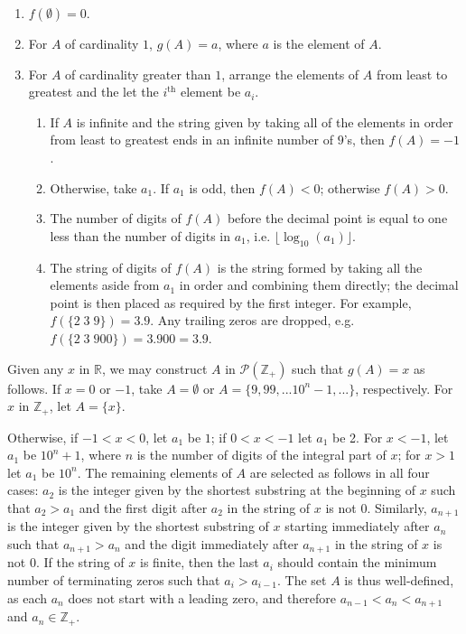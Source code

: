 \documentclass[12 pt]{article}
\begin{document}
\begin{enumerate}
	\item $f(\emptyset)=0$.
	\item For $A$ of cardinality $1$, $g(A)=a$, where $a$ is the element of $A$.
	\item For $A$ of cardinality greater than $1$, arrange the elements of $A$ from least to greatest and the let the $i^\textrm{th}$ element be $a_i$. 
		\begin{enumerate}
			\item If $A$ is infinite and the string given by taking all of the elements in order from least to greatest ends in an infinite number of $9$'s, then $f(A) = -1$.
			\item Otherwise, take $a_1$.  If $a_1$ is odd, then $f(A)<0$; otherwise $f(A)>0$.
			\item The number of digits of $f(A)$ before the decimal point is equal to one less than the number of digits in $a_1$, i.e. $\lfloor\log_{10}(a_1)\rfloor$.
			\item The string of digits of $f(A)$ is the string formed by taking all the elements aside from $a_1$ in order and combining them directly; the decimal point is then placed as required by the first integer. For example, $f(\{2\; 3\; 9\}) = 3.9$.  Any trailing zeros are dropped, e.g. $f(\{2\; 3\; 900\})=3.900=3.9$.
		\end{enumerate}
\end{enumerate}

Given any $x$ in $\mathbb{R}$, we may construct $A$ in $\mathcal{P}(\mathbb{Z_+})$ such that $g(A)=x$ as follows.  If $x=0$ or $-1$, take $A=\emptyset$ or $A=\{9, 99, ... 10^n-1, ...\}$, respectively. For $x$ in $\mathbb{Z}_+$, let $A = \{x\}$.  

Otherwise, if $-1<x<0$, let $a_1$ be $1$; if $0<x<-1$ let $a_1$ be 2.  For $x<-1$, let $a_1$ be $10^n+1$, where $n$ is the number of digits of the integral part of $x$; for $x>1$ let $a_1$ be $10^n$.  The remaining elements of $A$ are selected as follows in all four cases: $a_2$ is the integer given by the shortest substring at the beginning of $x$ such that $a_2>a_1$ and the first digit after $a_2$ in the string of $x$ is not $0$.  Similarly,  $a_{n+1}$ is the integer given by the shortest substring of $x$ starting immediately after $a_n$ such that $a_{n+1}>a_n$ and the digit immediately after $a_{n+1}$ in the string of $x$ is not $0$.  If the string of $x$ is finite, then the last $a_i$ should contain the minimum number of terminating zeros such that $a_i>a_{i-1}$.  The set $A$ is thus well-defined, as each $a_n$ does not start with a leading zero, and therefore $a_{n-1}<a_n<a_{n+1}$ and $a_n\in\mathbb{Z}_+$.
\end{document}
